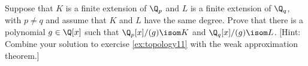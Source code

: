\documentclass[11pt]{book}
\begin{document}
\begin{ch}
\begin{exercise}\label{ex:topology12}
Suppose that $K$ is a finite extension of $\Q_p$ and $L$
is a finite extension of $\Q_q$, with $p\neq q$ and assume
that $K$ and $L$ have the same degree.  Prove that
there is a polynomial $g\in \Q[x]$ such that $\Q_p[x]/(g)\isom K$
and $\Q_q[x]/(g)\isom L$.  [Hint: Combine your solution to exercise \ref{ex:topology11} with the weak approximation theorem.]
\end{exercise}
\end{ch}
\end{document}

